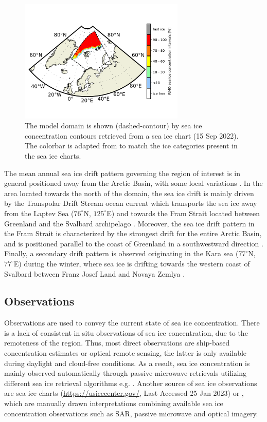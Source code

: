 \documentclass[../main/thesis.tex]{subfiles}
\begin{document}
\begin{figure}
    \centering
    \includegraphics[width = 0.7\textwidth]{study_area.pdf}
    \caption{\label{fig:studyarea}The model domain is shown (dashed-contour) by sea ice concentration contours retrieved from a sea ice chart (15 Sep 2022). The colorbar is adapted from \protect\citet{WMO2014} to match the ice categories present in the sea ice charts.}
\end{figure}

The mean annual sea ice drift pattern governing the region of interest is in general positioned away from the Arctic Basin, with some local variations \citep{Barry1993}. In the area located towards the north of the domain, the sea ice drift is mainly driven by the Transpolar Drift Stream ocean current which transports the sea ice away from the Laptev Sea ($76^\circ$N, $125^\circ$E) and towards the Fram Strait located between Greenland and the Svalbard archipelago \citep{Colony1984}. Moreover, the sea ice drift pattern in the Fram Strait is characterized by the strongest drift for the entire Arctic Basin, and is positioned parallel to the coast of Greenland in a southwestward direction \citep{Barry1993}. Finally, a secondary drift pattern is observed originating in the Kara sea ($77^\circ$N, $77^\circ$E) during the winter, where sea ice is drifting towards the western coast of Svalbard between Franz Josef Land and Novaya Zemlya \citep{Kaur2018}.

\subsection{Observations}
Observations are used to convey the current state of sea ice concentration. There is a lack of consistent in situ observations of sea ice concentration, due to the remoteness of the region. Thus, most direct observations are ship-based concentration estimates \citep{Kern2019} or optical remote sensing, the latter is only available during daylight and cloud-free conditions. As a result, sea ice concentration is mainly observed automatically through passive microwave retrievals utilizing different sea ice retrieval algorithms e.g. \citep{Comiso1997,Spreen2008, Lavergne2019a}. Another source of sea ice observations are sea ice charts (\url{https://usicecenter.gov/}, Last Accessed 25 Jan 2023) or \citep{Dinessen2020}, which are manually drawn interpretations combining available sea ice concentration observations such as SAR, passive microwave and optical imagery. 
\end{document}
